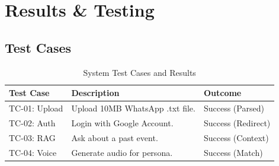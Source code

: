 \documentclass[12pt,a4paper]{report}
\begin{document}
\chapter{Results \& Testing}

\section{Test Cases}
\begin{table}[H]
\centering
\caption{System Test Cases and Results}
\vspace{0.5em}
\begin{tabular}{@{}lll@{}}
\toprule
\textbf{Test Case} & \textbf{Description} & \textbf{Outcome} \\ \midrule
TC-01: Upload & Upload 10MB WhatsApp .txt file. & Success (Parsed) \\
TC-02: Auth & Login with Google Account. & Success (Redirect) \\
TC-03: RAG & Ask about a past event. & Success (Context) \\
TC-04: Voice & Generate audio for persona. & Success (Match) \\ \bottomrule
\end{tabular}
\label{tab:testcases}
\end{table}
\end{document}
